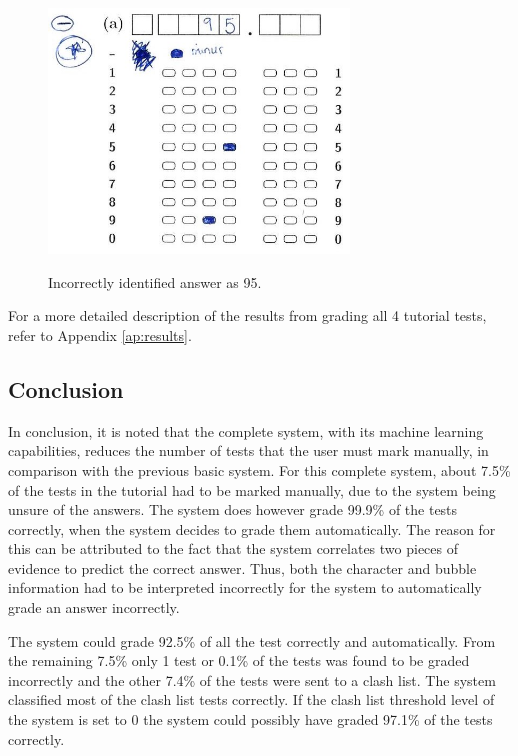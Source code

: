 \begin{figure}
  \centering
  \includegraphics[width=8cm]{wrongResult}\\
  \caption{Incorrectly identified answer as 95.}
  \label{fig:wrongAns}
\end{figure}

For a more detailed description of the results from grading all 4 tutorial tests, refer to Appendix \ref{ap:results}.

\subsection{Conclusion}

In conclusion, it is noted that the complete system, with its machine learning capabilities, reduces the number of tests that the user must mark manually, in comparison with the previous basic system. For this complete system, about 7.5\% of the tests in the tutorial had to be marked manually, due to the system being unsure of the answers. The system does however grade 99.9\% of the tests correctly, when the system decides to grade them automatically. The reason for this can be attributed to the fact that the system correlates two pieces of evidence to predict the correct answer. Thus, both the character and bubble information had to be interpreted incorrectly for the system to automatically grade an answer incorrectly. 

The system could grade 92.5\% of all the test correctly and automatically. From the remaining 7.5\% only 1 test or 0.1\% of the tests was found to be graded incorrectly and the other 7.4\% of the tests were sent to a clash list. The system classified most of the clash list tests correctly. If the clash list threshold level of the system is set to 0 the system could possibly have graded 97.1\% of the tests correctly.

